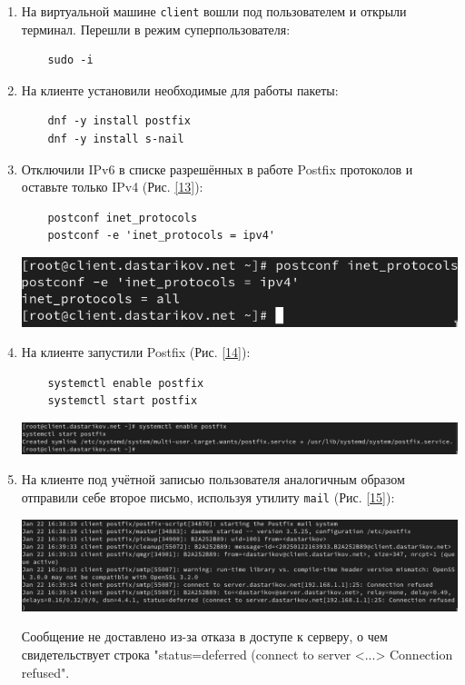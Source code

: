 \begin{enumerate}
\item На виртуальной машине \texttt{client} вошли под пользователем и открыли терминал. Перешли в режим суперпользователя:
  \begin{verbatim}
    sudo -i
  \end{verbatim}
\item На клиенте установили необходимые для работы пакеты:
  \begin{verbatim}
    dnf -y install postfix
    dnf -y install s-nail
  \end{verbatim}

\item Отключили IPv6 в списке разрешённых в работе Postfix протоколов и оставьте только IPv4 (Рис. \ref{13}):
  \begin{verbatim}
    postconf inet_protocols
    postconf -e 'inet_protocols = ipv4'
  \end{verbatim}
\begin{center}
    \centering
    \includegraphics[width=\textwidth]{../images/image13.png}
    \label{13}
\end{center}

\item На клиенте запустили Postfix (Рис. \ref{14}):
  \begin{verbatim}
    systemctl enable postfix
    systemctl start postfix
  \end{verbatim}
\begin{center}
    \centering
    \includegraphics[width=\textwidth]{../images/image14.png}
    \label{14}
\end{center}

\item На клиенте под учётной записью пользователя аналогичным образом отправили себе второе письмо, используя утилиту \texttt{mail} (Рис. \ref{15}):
\begin{center}
    \centering
    \includegraphics[width=\textwidth]{../images/image15.png}
    \label{15}
\end{center}
Сообщение не доставлено из-за отказа в доступе к серверу, о чем свидетельствует строка "status=deferred (connect to server <...> Connection refused".


\end{enumerate}
